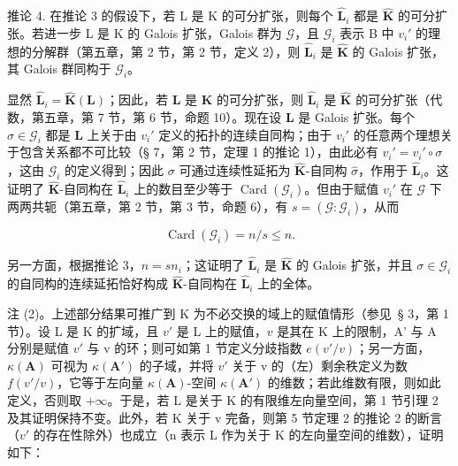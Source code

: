 推论 4. 在推论 3 的假设下，若 L 是 K 的可分扩张，则每个 \(\hat{\mathbf{L}}_i\) 都是 \(\hat{\mathbf{K}}\) 的可分扩张。若进一步 L 是 K 的 Galois 扩张，Galois 群为 \(\mathcal{G}\)，且 \(\mathcal{G}_i\) 表示 B 中 \(v_i'\) 的理想的分解群（第五章，第 2 节，第 2 节，定义 2），则 \(\hat{\mathbf{L}}_i\) 是 \(\hat{\mathbf{K}}\) 的 Galois 扩张，其 Galois 群同构于 \(\mathcal{G}_i\)。

显然 \(\hat{\mathbf{L}}_i = \hat{\mathbf{K}}(\mathbf{L})\)；因此，若 \(\mathbf{L}\) 是 \(\mathbf{K}\) 的可分扩张，则 \(\hat{\mathbf{L}}_i\) 是 \(\hat{\mathbf{K}}\) 的可分扩张（代数，第五章，第 7 节，第 6 节，命题 10）。现在设 \(\mathbf{L}\) 是 Galois 扩张。每个 \(\sigma \in \mathcal{G}_i\) 都是 \(\mathbf{L}\) 上关于由 \(v_i'\) 定义的拓扑的连续自同构；由于 \(v_i'\) 的任意两个理想关于包含关系都不可比较（§ 7，第 2 节，定理 1 的推论 1），由此必有 \(v_i' = v_i' \circ \sigma\)，这由 \(\mathcal{G}_i\) 的定义得到；因此 \(\sigma\) 可通过连续性延拓为 \(\hat{\mathbf{K}}\)-自同构 \(\hat{\sigma}\)，作用于 \(\hat{\mathbf{L}}_i\)。这证明了 \(\hat{\mathbf{K}}\)-自同构在 \(\hat{\mathbf{L}}_i\) 上的数目至少等于 \(\operatorname{Card}(\mathcal{G}_i)\)。但由于赋值 \(v_i'\) 在 \(\mathcal{G}\) 下两两共轭（第五章，第 2 节，第 3 节，命题 6），有 \(s = (\mathcal{G}: \mathcal{G}_i)\)，从而

\[
\operatorname{Card} \left(\mathcal {G} _ {i}\right) = n / s \leqslant n.
\]

另一方面，根据推论 3，\(n = sn_{i}\)；这证明了 \(\hat{\mathbf{L}}_{i}\) 是 \(\hat{\mathbf{K}}\) 的 Galois 扩张，并且 \(\sigma \in \mathcal{G}_{i}\) 的自同构的连续延拓恰好构成 \(\hat{\mathbf{K}}\)-自同构在 \(\hat{\mathbf{L}}_{i}\) 上的全体。

注 (2)。上述部分结果可推广到 K 为不必交换的域上的赋值情形（参见~§ 3，第 1 节）。设 L 是 K 的扩域，且 \(v'\) 是 L 上的赋值，\(v\) 是其在 K 上的限制，A' 与 A 分别是赋值 \(v'\) 与 v 的环；则可如第 1 节定义分歧指数 \(e(v'/v)\)；另一方面，\(\kappa(\mathbf{A})\) 可视为 \(\kappa(\mathbf{A}')\) 的子域，并将 \(v'\) 关于 v 的（左）剩余秩定义为数 \(f(v'/v)\)，它等于左向量 \(\kappa(\mathbf{A})\)-空间 \(\kappa(\mathbf{A}')\) 的维数；若此维数有限，则如此定义，否则取 \(+\infty\)。于是，若 L 是关于 K 的有限维左向量空间，第 1 节引理 2 及其证明保持不变。此外，若 K 关于 v 完备，则第 5 节定理 2 的推论 2 的断言（\(v'\) 的存在性除外）也成立（n 表示 L 作为关于 K 的左向量空间的维数），证明如下：

